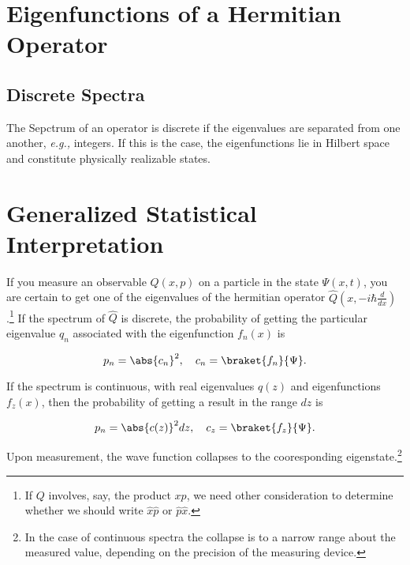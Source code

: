 \documentclass[a4paper,12pt]{report}
\begin{document}
\section{Eigenfunctions of a Hermitian Operator}

\subsection{Discrete Spectra}

The Sepctrum of an operator is discrete if the eigenvalues are separated from one another, \textit{e.g.,} integers. If this is the case, the eigenfunctions lie in Hilbert space and constitute physically realizable states. 

\section{Generalized Statistical Interpretation}

If you measure an observable \(Q(x,p)\) on a particle in the state \(\Psi (x,t)\), you are certain to get one of the eigenvalues of the hermitian operator \(\hat{Q} \displaystyle \left(x,-i\hbar \frac{d}{dx} \right)\).\footnote{If \(Q\) involves, say, the product \(xp\), we need other consideration to determine whether we should write \(\hat{x} \hat{p} \text { or } \hat{p} \hat{x}  \).} If the spectrum of \(\hat{Q} \) is discrete, the probability of getting the particular eigenvalue \(q_{n} \) associated with the eigenfunction \(f_{n} (x)\) is 

\begin{equation}
  p_{n} = \abs{c_{n} }^2, \quad c_{n} = \braket{f_{n} }{\Psi } .    
\end{equation}

If the spectrum is continuous, with real eigenvalues \(q(z)\) and eigenfunctions \(f_{z} (x)\), then the probability of getting a result in the range \(dz\) is 

\begin{equation}
  p_{n} = \abs{c(z)}^2dz, \quad c_{z} = \braket{f_{z} }{\Psi }.
\end{equation}

Upon measurement, the wave function collapses to the cooresponding eigenstate.\footnote{In the case of continuous spectra the collapse is to a narrow range about the measured value, depending on the precision of the measuring device.} 
\end{document}
